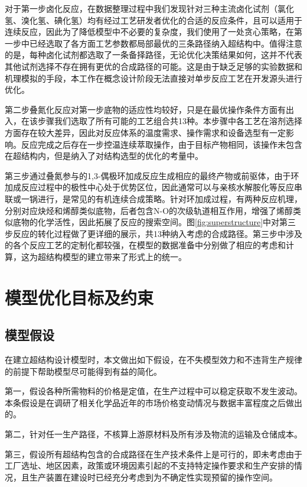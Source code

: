 对于第一步卤化反应，在数据整理过程中我们发现针对三种主流卤化试剂（氯化氢、溴化氢、碘化氢）均有经过工艺研发者优化的合适的反应条件，且可以适用于连续反应，因此为了降低模型中不必要的复杂度，我们使用了一处贪心策略，在第一步中已经选取了各方面工艺参数都局部最优的三条路径纳入超结构中。值得注意的是，每种卤化试剂都选取了一条备择路径，无论优化决策结果如何，这并不代表其他试剂选择不存在拥有更优的合成路径的可能。这是由于缺乏足够的实验数据和机理模拟的手段，本工作在概念设计阶段无法直接对单步反应工艺在开发源头进行优化。

第二步叠氮化反应对第一步底物的适应性均较好，只是在最优操作条件方面有出入，在该步骤我们选取了所有可能的工艺组合共13种。本步骤中各工艺在溶剂选择方面存在较大差异，因此对反应体系的温度需求、操作需求和设备选型有一定影响。反应完成之后存在一步控温连续萃取操作，由于目标产物相同，该操作未包含在超结构内，但是纳入了对结构选型的优化的考量中。

第三步通过叠氮参与的1,3-偶极环加成反应生成相应的最终产物或前驱体，由于环加成反应过程中的极性中心处于优势区位，因此通常可以与亲核水解胺化等反应串联或一锅进行，是常见的有机连续合成策略。针对环加成过程，有两种反应机理，分别对应炔烃和烯醇类似底物，后者包含N-O的次级轨道相互作用，增强了烯醇类似底物的化学活性，因此拓展了反应的搜索空间\cite{paz2018}。图\ref{fig:superstructure}中对第三步反应的转化过程做了更详细的展示，共13种纳入考虑的合成路径。第三步中涉及的各个反应工艺的定制化都较强，在模型的数据准备中分别做了相应的考虑和计算，这为超结构模型的建立带来了形式上的统一。

\section{模型优化目标及约束}
\label{section:model}
\subsection{模型假设}

在建立超结构设计模型时，本文做出如下假设，在不失模型效力和不违背生产规律的前提下帮助模型尽可能得到有益的简化。

第一，假设各种所需物料的价格是定值，在生产过程中可以稳定获取不发生波动。本条假设是在调研了相关化学品近年的市场价格变动情况与数据丰富程度之后做出的。

第二，针对任一生产路径，不核算上游原材料及所有涉及物流的运输及仓储成本。

第三，假设所有超结构包含的合成路径在生产技术条件上是可行的，即未考虑由于工厂选址、地区因素，政策或环境因素引起的不支持特定操作要求和生产安排的情况，且生产装置在建设时已经充分考虑到为不确定性实现预留的操作空间。

